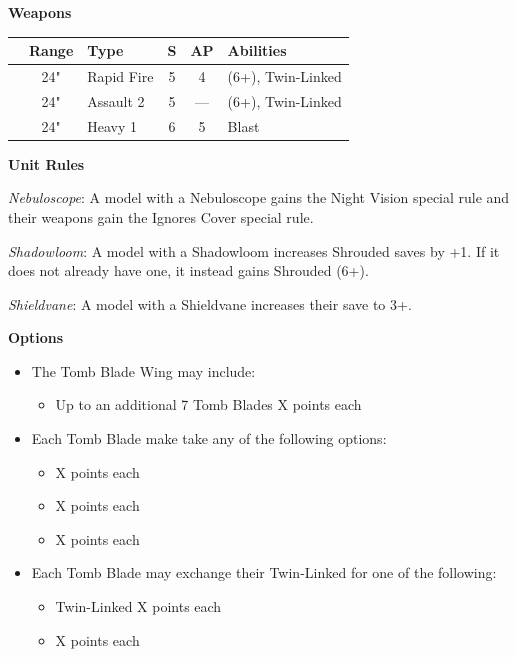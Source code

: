\begin{minipage}[t]{0.72\textwidth}
	\vspace*{2em}
	\textbf{Weapons}
	
	\begin{tabular}{L{90 pt} c C{40pt} *{2}{c} >{\raggedright\arraybackslash}p{130pt}}
		& Range & Type & S & AP & Abilities \\
		\hline
		 & 24" & Rapid Fire & 5 & 4 &  (6+), Twin-Linked \\
		 & 24" & Assault 2 & 5 & — &  (6+), Twin-Linked \\
		 & 24" & Heavy 1 & 6 & 5 & Blast \\
	\end{tabular}
	
	\vspace*{2em}
	\textbf{Unit Rules}
	
	\textit{Nebuloscope}: A model with a Nebuloscope gains the Night Vision special rule and their weapons gain the Ignores Cover special rule.
	
	\textit{Shadowloom}: A model with a Shadowloom increases Shrouded saves by +1. If it does not already have one, it instead gains Shrouded (6+).
	
	\textit{Shieldvane}: A model with a Shieldvane increases their save to 3+.
	
	\vspace*{2em}
	\textbf{Options}
	\begin{itemize}
		\item The Tomb Blade Wing may include:
		\begin{itemize}
			\item Up to an additional 7 Tomb Blades \dotfill X points each
		\end{itemize}
		\item Each Tomb Blade make take any of the following options:
		\begin{itemize}
			\item {} \dotfill X points each
			\item {} \dotfill X points each
			\item {} \dotfill X points each
		\end{itemize}
		\item Each Tomb Blade may exchange their Twin-Linked  for one of the following:
		\begin{itemize}
			\item Twin-Linked  \dotfill X points each
			\item {} \dotfill X points each
		\end{itemize}
	\end{itemize}
\end{minipage}